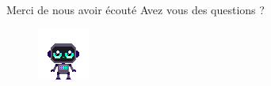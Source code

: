 \documentclass{beamer}
\begin{document}
\begin{frame}[allowpagebreak,T]{Merci de nous avoir écouté}
    \centering
    Avez vous des questions ?
    \begin{figure}
        \centering
        \includegraphics[width=0.5\linewidth]{images/character_placeholder.png}
    \end{figure}
\end{frame}
\end{document}
